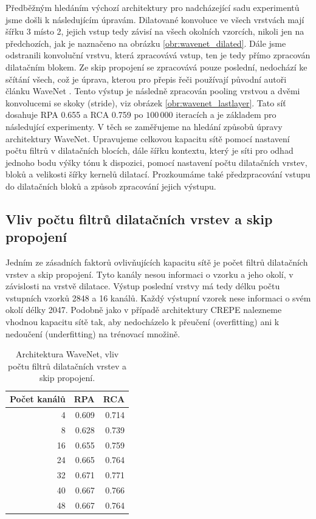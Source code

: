 Předběžným hledáním výchozí architektury pro nadcházející sadu experimentů jsme došli k následujícím úpravám. Dilatované konvoluce ve všech vrstvách mají šířku 3 místo 2, jejich vstup tedy závisí na všech okolních vzorcích, nikoli jen na předchozích, jak je naznačeno na obrázku \ref{obr:wavenet_dilated}. Dále jsme odstranili konvoluční vrstvu, která zpracovává vstup, ten je tedy přímo zpracován dilatačním blokem. Ze skip propojení se zpracovává pouze poslední, nedochází ke sčítání všech, což je úprava, kterou pro přepis řeči používají původní autoři článku WaveNet \cite{Oord2016}. Tento výstup je následně zpracován pooling vrstvou a dvěmi konvolucemi se skoky (stride), viz obrázek \ref{obr:wavenet_lastlayer}. Tato síť dosahuje RPA 0.655 a RCA 0.759 po $100\,000$ iteracích a je základem pro následující experimenty. V těch se zaměřujeme na hledání způsobů úpravy architektury WaveNet. Upravujeme celkovou kapacitu sítě pomocí nastavení počtu filtrů v dilatačních blocích, dále šířku kontextu, který je síti pro odhad jednoho bodu výšky tónu k dispozici, pomocí nastavení počtu dilatačních vrstev, bloků a velikosti šířky kernelů dilatací. Prozkoumáme také předzpracování vstupu do dilatačních bloků a způsob zpracování jejich výstupu.

\subsection{Vliv počtu filtrů dilatačních vrstev a skip propojení}

Jedním ze zásadních faktorů ovlivňujících kapacitu sítě je počet filtrů dilatačních vrstev a skip propojení. Tyto kanály nesou informaci o vzorku a jeho okolí, v závislosti na vrstvě dilatace. Výstup poslední vrstvy má tedy délku počtu vstupních vzorků 2848 a 16 kanálů. Každý výstupní vzorek nese informaci o svém okolí délky 2047. Podobně jako v případě architektury CREPE nalezneme vhodnou kapacitu sítě tak, aby nedocházelo k přeučení (overfitting) ani k nedoučení (underfitting) na trénovací množině.

\begin{table}[h!]
\centering
    \begin{tabular}{rrr}
    \toprule
    Počet kanálů &   RPA &   RCA \\
    \midrule
            4 & 0.609 & 0.714 \\
            8 & 0.628 & 0.739 \\
            16 & 0.655 & 0.759 \\
            24 & 0.665 & 0.764 \\
            32 & 0.671 & 0.771 \\
            40 & 0.667 & 0.766 \\
            48 & 0.667 & 0.764 \\
    \bottomrule
    \end{tabular}

\caption{Architektura WaveNet, vliv počtu filtrů dilatačních vrstev a skip propojení.}\label{tab:wavenet_dil_skip_channels}
\end{table}

